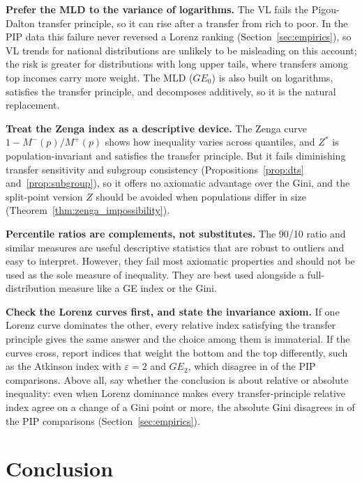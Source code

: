\documentclass[12pt]{article}
\theoremstyle{plain}
\theoremstyle{definition}
\theoremstyle{remark}
\begin{document}
\textbf{Prefer the MLD to the variance of logarithms.}
The VL fails the Pigou-Dalton transfer principle, so it can rise after a transfer from rich to poor.
In the PIP data this failure never reversed a Lorenz ranking (Section~\ref{sec:empirics}), so VL trends for national distributions are unlikely to be misleading on this account; the risk is greater for distributions with long upper tails, where transfers among top incomes carry more weight.
The MLD ($GE_0$) is also built on logarithms, satisfies the transfer principle, and decomposes additively, so it is the natural replacement.

\textbf{Treat the Zenga index as a descriptive device.}
The Zenga curve $1 - M^{-}(p)/M^{+}(p)$ shows how inequality varies across quantiles, and $Z^*$ is population-invariant and satisfies the transfer principle.
But it fails diminishing transfer sensitivity and subgroup consistency (Propositions~\ref{prop:dts} and~\ref{prop:subgroup}), so it offers no axiomatic advantage over the Gini, and the split-point version $Z$ should be avoided when populations differ in size (Theorem~\ref{thm:zenga_impossibility}).

\textbf{Percentile ratios are complements, not substitutes.}
The 90/10 ratio and similar measures are useful descriptive statistics that are robust to outliers and easy to interpret.
However, they fail most axiomatic properties and should not be used as the sole measure of inequality.
They are best used alongside a full-distribution measure like a GE index or the Gini.

\textbf{Check the Lorenz curves first, and state the invariance axiom.}
If one Lorenz curve dominates the other, every relative index satisfying the transfer principle gives the same answer and the choice among them is immaterial.
If the curves cross, report indices that weight the bottom and the top differently, such as the Atkinson index with $\varepsilon = 2$ and $GE_2$, which disagree in \PipDisGeTwoAtkTwo{} of the PIP comparisons.
Above all, say whether the conclusion is about relative or absolute inequality: even when Lorenz dominance makes every transfer-principle relative index agree on a change of a Gini point or more, the absolute Gini disagrees in \PipRelAbsOppMaterialDom{} of the PIP comparisons (Section~\ref{sec:empirics}).

\section{Conclusion}\label{sec:conclusion}
\end{document}
